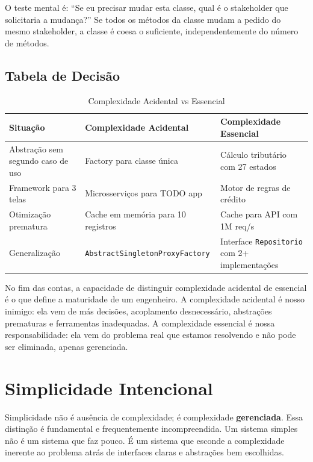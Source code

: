 O teste mental é: ``Se eu precisar mudar esta classe, qual é o stakeholder que
solicitaria a mudança?'' Se todos os métodos da classe mudam a pedido do mesmo
stakeholder, a classe é coesa o suficiente, independentemente do número de
métodos.

\subsection{Tabela de Decisão}

\begin{table}[h!]
\centering
\caption{Complexidade Acidental vs Essencial}
\begin{tabular}{p{3.5cm} p{4.5cm} p{4.5cm}}
\toprule
\textbf{Situação} & \textbf{Complexidade Acidental} & \textbf{Complexidade Essencial} \\
\midrule
Abstração sem segundo caso de uso & Factory para classe única & Cálculo tributário com 27 estados \\
Framework para 3 telas & Microsserviços para TODO app & Motor de regras de crédito \\
Otimização prematura & Cache em memória para 10 registros & Cache para API com 1M req/s \\
Generalização & \texttt{AbstractSingletonProxyFactory} & Interface \texttt{Repositorio} com 2+ implementações \\
\bottomrule
\end{tabular}
\end{table}

No fim das contas, a capacidade de distinguir complexidade acidental de essencial
é o que define a maturidade de um engenheiro. A complexidade acidental
é nosso inimigo: ela vem de más decisões, acoplamento desnecessário, abstrações
prematuras e ferramentas inadequadas. A complexidade essencial é nossa
responsabilidade: ela vem do problema real que estamos resolvendo e não pode
ser eliminada, apenas gerenciada.


\section{Simplicidade Intencional}

Simplicidade não é ausência de complexidade; é complexidade \textbf{gerenciada}.
Essa distinção é fundamental e frequentemente incompreendida. Um sistema simples
não é um sistema que faz pouco. É um sistema que esconde a complexidade
inerente ao problema atrás de interfaces claras e abstrações bem escolhidas.

